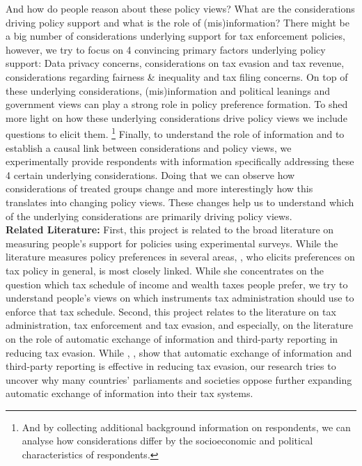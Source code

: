 \documentclass[11pt]{article}
\begin{document}
And how do people reason about these policy views? What are the considerations driving policy support and what is the role of (mis)information? There might be a big number of considerations underlying support for tax enforcement policies, however, we try to focus on 4 convincing primary factors underlying policy support: Data privacy concerns, considerations on tax evasion and tax revenue, considerations regarding fairness \& inequality and tax filing concerns. On top of these underlying considerations, (mis)information and political leanings and government views can play a strong role in policy preference formation. To shed more light on how these underlying considerations drive policy views we include questions to elicit them. \footnote{And by collecting additional background information on respondents, we can analyse how considerations differ by the socioeconomic and political characteristics of respondents.} Finally, to understand the role of information and to establish a causal link between considerations and policy views, we experimentally provide respondents with information specifically addressing these 4 certain underlying considerations. Doing that we can observe how considerations of treated groups change and more interestingly how this translates into changing policy views. These changes help us to understand which of the underlying considerations are primarily driving policy views. \\[0.5em]
\textbf{Related Literature:} First, this project is related to the broad literature on measuring people's support for policies using experimental surveys. While the literature measures policy preferences in several areas, \textcite{stantcheva2021understanding}, who elicits preferences on tax policy in general, is most closely linked. While she concentrates on the question which tax schedule of income and wealth taxes people prefer, we try to understand people's views on which instruments tax administration should use to enforce that tax schedule. 
Second, this project relates to the literature on tax administration, tax enforcement and tax evasion, and especially, on the literature on the role of automatic exchange of information and third-party reporting in reducing tax evasion. While \textcite{kleven2011unwilling}, \textcite{pomeranz2015no}, \textcite{slemrod2017does} show that automatic exchange of information and third-party reporting is effective in reducing tax evasion, our research tries to uncover why many countries' parliaments and societies oppose further expanding automatic exchange of information into their tax systems. 
\end{document}
